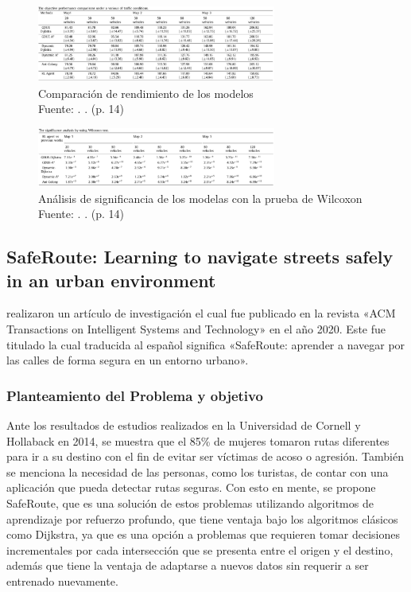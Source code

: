 \begin{figure}[h]
	\begin{center}
		\includegraphics[width=0.7\textwidth]{2/figures/ResultSumo.jpg}
		\caption{Comparación de rendimiento de los modelos \\
			Fuente: \cite{pr_koh}. . (p. 14)}
		\label{1:fig2}
	\end{center}
\end{figure}

 \begin{figure}[h]
	\begin{center}
		\includegraphics[width=0.7\textwidth]{2/figures/Result2Sumo.jpg}
		\caption{Análisis de significancia de los modelas con la prueba de Wilcoxon \\
			Fuente: \cite{pr_koh}. . (p. 14)}
		\label{1:fig2}
	\end{center}
\end{figure}

\subsection{SafeRoute: Learning to navigate streets safely in an urban environment \citep*{pr_saferoute}}
\citeauthor{pr_saferoute} realizaron un artículo de investigación el cual fue publicado en la revista «ACM Transactions on Intelligent Systems and Technology» en el año 2020. Este fue titulado  la cual traducida al español significa «SafeRoute: aprender a navegar por las calles de forma segura en un entorno urbano».

\subsubsection{Planteamiento del Problema y objetivo }
Ante los resultados de estudios realizados en la Universidad de Cornell y Hollaback en 2014, se muestra que el 85\% de mujeres tomaron rutas diferentes para ir a su destino con el fin de evitar ser víctimas de acoso o agresión. También se menciona la necesidad de las personas, como los turistas, de contar con una aplicación que pueda detectar rutas seguras. Con esto en mente, se propone SafeRoute, que es una solución de estos problemas utilizando algoritmos de aprendizaje por refuerzo profundo, que tiene ventaja bajo los algoritmos clásicos como Dijkstra, ya que es una opción a problemas que requieren tomar decisiones incrementales por cada intersección que se presenta entre el origen y el destino, además que tiene la ventaja de adaptarse a nuevos datos sin requerir a ser entrenado nuevamente.


